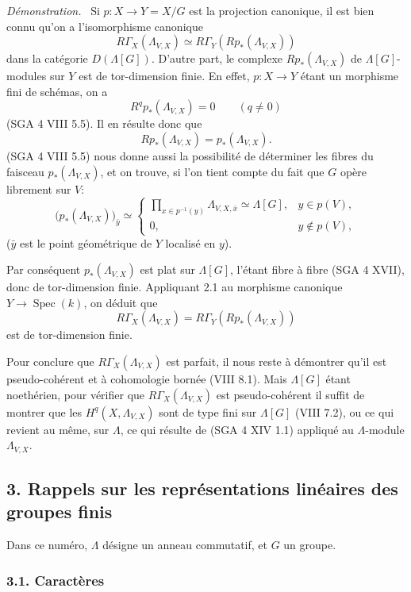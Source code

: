 \documentclass[11pt]{article}
\newenvironment{prooftext}[1][Proof]{\par\noindent\emph{#1.}\ }{\par\medskip}
\DeclareMathOperator{\Spec}{Spec}
\providecommand{\Spec}{\operatorname{Spec}}
\providecommand{\Spec}{\operatorname{Spec}}
\providecommand{\Spec}{\operatorname{Spec}}
\providecommand{\Spec}{\operatorname{Spec}}
\begin{document}
\begin{prooftext}[Démonstration]
Si $p:X\to Y=X/G$ est la projection canonique, il est bien connu qu'on a l'isomorphisme canonique
\[
R\Gamma_X(\Lambda_{V,X})\simeq R\Gamma_Y(Rp_*(\Lambda_{V,X}))
\]
dans la catégorie $D(\Lambda[G])$. D'autre part, le complexe $Rp_*(\Lambda_{V,X})$ de $\Lambda[G]$-modules sur $Y$ est de tor-dimension finie. En effet, $p:X\to Y$ étant un morphisme fini de schémas, on a
\[
R^q p_*(\Lambda_{V,X})=0\qquad(q\ne0)
\]
(SGA 4 VIII 5.5). Il en résulte donc que
\[
Rp_*(\Lambda_{V,X})=p_*(\Lambda_{V,X}).
\]
(SGA 4 VIII 5.5) nous donne aussi la possibilité de déterminer les fibres du faisceau $p_*(\Lambda_{V,X})$, et on trouve, si l'on tient compte du fait que $G$ opère librement sur $V$:
\[
\bigl(p_*(\Lambda_{V,X})\bigr)_{\bar y}\simeq
\begin{cases}
\displaystyle \prod_{x\in p^{-1}(y)}\Lambda_{V,X,\bar x}\simeq \Lambda[G],& y\in p(V),\\[1em]
0,& y\notin p(V),
\end{cases}
\]
($\bar y$ est le point géométrique de $Y$ localisé en $y$).

Par conséquent $p_*(\Lambda_{V,X})$ est plat sur $\Lambda[G]$, l'étant fibre à fibre (SGA 4 XVII), donc de tor-dimension finie. Appliquant 2.1 au morphisme canonique $Y\to\Spec(k)$, on déduit que
\[
R\Gamma_X(\Lambda_{V,X})=R\Gamma_Y(Rp_*(\Lambda_{V,X}))
\]
est de tor-dimension finie.

Pour conclure que $R\Gamma_X(\Lambda_{V,X})$ est parfait, il nous reste à démontrer qu'il est pseudo-cohérent et à cohomologie bornée (VIII 8.1). Mais $\Lambda[G]$ étant noethérien, pour vérifier que $R\Gamma_X(\Lambda_{V,X})$ est pseudo-cohérent il suffit de montrer que les $H^q(X,\Lambda_{V,X})$ sont de type fini sur $\Lambda[G]$ (VIII 7.2), ou ce qui revient au même, sur $\Lambda$, ce qui résulte de (SGA 4 XIV 1.1) appliqué au $\Lambda$-module $\Lambda_{V,X}$.
\end{prooftext}

\subsection*{3. Rappels sur les représentations linéaires des groupes finis}

Dans ce numéro, $\Lambda$ désigne un anneau commutatif, et $G$ un groupe.

\subsubsection*{3.1. Caractères}
\end{document}
